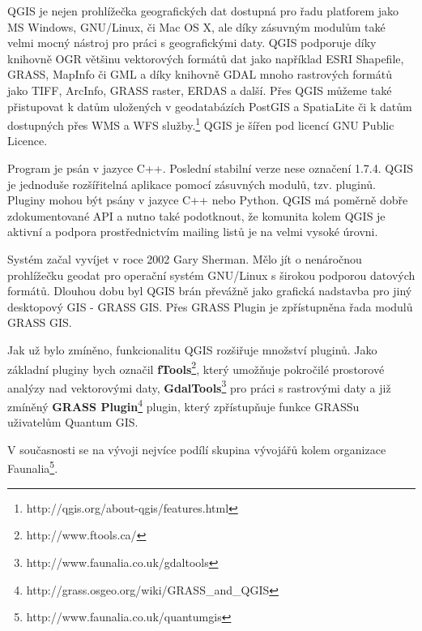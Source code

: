QGIS je nejen prohlížečka geografických dat dostupná pro řadu
platforem jako MS Windows, GNU/Linux, či Mac OS X, ale díky zásuvným
modulům také velmi mocný nástroj pro práci s geografickými daty. QGIS
podporuje díky knihovně OGR většinu vektorových formátů dat
jako například ESRI Shapefile, GRASS, MapInfo či GML a díky
knihovně  GDAL mnoho rastrových formátů jako TIFF,
ArcInfo, GRASS raster, ERDAS a další. Přes QGIS můžeme také
přistupovat k datům uložených v geodatabázích PostGIS a SpatiaLite či
k datům dostupných přes WMS a WFS
služby.\footnote{http://qgis.org/about-qgis/features.html} QGIS je
šířen pod licencí GNU Public Licence.

Program je psán v jazyce C++. Poslední stabilní verze nese označení
1.7.4. QGIS je jednoduše rozšířitelná aplikace pomocí zásuvných
modulů, tzv. pluginů. Pluginy mohou být psány v jazyce C++ nebo
Python. QGIS má poměrně dobře zdokumentované API a nutno také
podotknout, že komunita kolem QGIS je aktivní a podpora
prostřednictvím mailing listů je na velmi vysoké úrovni.

Systém začal vyvíjet v roce 2002 Gary Sherman. Mělo jít o nenáročnou
prohlížečku geodat pro operační systém GNU/Linux s širokou podporou
datových formátů. Dlouhou dobu byl QGIS brán převážně jako grafická
nadstavba pro jiný desktopový GIS - GRASS GIS. Přes GRASS Plugin je
zpřístupněna řada modulů GRASS GIS.

Jak už bylo zmíněno, funkcionalitu QGIS rozšiřuje množství
pluginů. Jako základní pluginy bych
označil  \textbf{fTools}\footnote{http://www.ftools.ca/},
který umožňuje pokročilé prostorové analýzy nad vektorovými
daty,  \textbf{GdalTools}\footnote{http://www.faunalia.co.uk/gdaltools}
pro práci s rastrovými daty a již zmíněný  \textbf{GRASS
Plugin}\footnote{http://grass.osgeo.org/wiki/GRASS\_and\_QGIS}
plugin, který zpřístupňuje funkce GRASSu uživatelům Quantum GIS.

V současnosti se na vývoji nejvíce podílí skupina vývojářů kolem
organizace 
Faunalia\footnote{http://www.faunalia.co.uk/quantumgis}.

